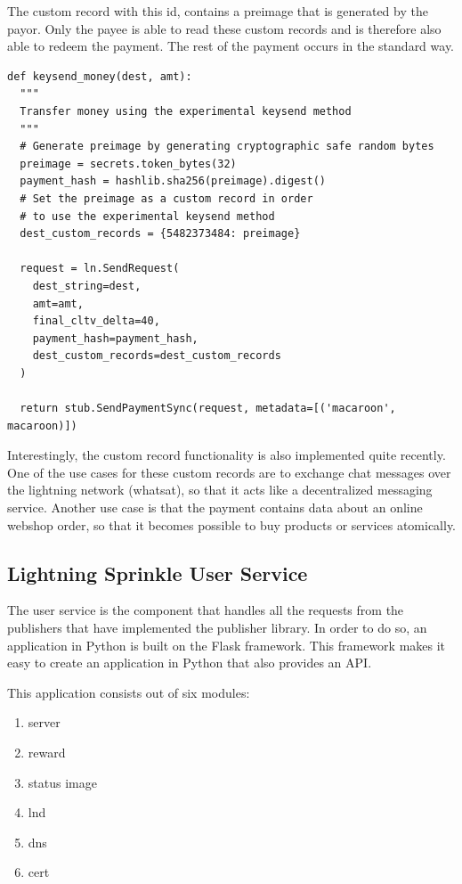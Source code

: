 The custom record with this id, contains a preimage that is generated by the payor. Only the payee is able to read these custom records and is therefore also able to redeem the payment. The rest of the payment occurs in the standard way.
\lstset{language=Python}
\lstset{frame=lines}
\lstset{basicstyle=\footnotesize}
\begin{lstlisting}
def keysend_money(dest, amt):
  """ 
  Transfer money using the experimental keysend method
  """
  # Generate preimage by generating cryptographic safe random bytes
  preimage = secrets.token_bytes(32) 
  payment_hash = hashlib.sha256(preimage).digest()
  # Set the preimage as a custom record in order 
  # to use the experimental keysend method
  dest_custom_records = {5482373484: preimage}

  request = ln.SendRequest(
    dest_string=dest,
    amt=amt,
    final_cltv_delta=40,
    payment_hash=payment_hash,
    dest_custom_records=dest_custom_records
  )
  
  return stub.SendPaymentSync(request, metadata=[('macaroon', macaroon)])

\end{lstlisting}

Interestingly, the custom record functionality is also implemented quite recently. One of the use cases for these custom records are to exchange chat messages over the lightning network (whatsat), so that it acts like a decentralized messaging service. Another use case is that the payment contains data about an online webshop order, so that it becomes possible to buy products or services atomically.


\subsection{Lightning Sprinkle User Service}

The user service is the component that handles all the requests from the publishers that have implemented the publisher library. In order to do so, an application in Python is built on the Flask framework. This framework makes it easy to create an application in Python that also provides an API.

This application consists out of six modules:
\begin{enumerate}
  \item server
  \item reward
  \item status image
  \item lnd
  \item dns
  \item cert 
\end{enumerate}

